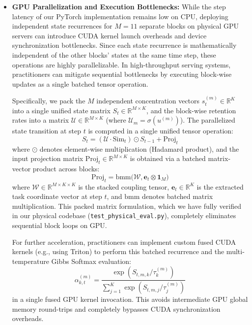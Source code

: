 \begin{itemize}
    \item \textbf{GPU Parallelization and Execution Bottlenecks:} While the step latency of our PyTorch implementation remains low on CPU, deploying independent state recurrences for $M=11$ separate blocks on physical GPU servers can introduce CUDA kernel launch overheads and device synchronization bottlenecks. Since each state recurrence is mathematically independent of the other blocks' states at the same time step, these operations are highly parallelizable. In high-throughput serving systems, practitioners can mitigate sequential bottlenecks by executing block-wise updates as a single batched tensor operation. 

    Specifically, we pack the $M$ independent concentration vectors $s^{(m)}_t \in \mathbb{R}^K$ into a single unified state matrix $S_t \in \mathbb{R}^{M \times K}$, and the block-wise retention rates into a matrix $\mathcal{U} \in \mathbb{R}^{M \times K}$ (where $\mathcal{U}_{m} = \sigma(u^{(m)})$). The parallelized state transition at step $t$ is computed in a single unified tensor operation:
    \begin{equation}
        S_t = (\mathcal{U} \cdot \text{Sim}_t) \odot S_{t-1} + \text{Proj}_t
    \end{equation}
    where $\odot$ denotes element-wise multiplication (Hadamard product), and the input projection matrix $\text{Proj}_t \in \mathbb{R}^{M \times K}$ is obtained via a batched matrix-vector product across blocks:
    \begin{equation}
        \text{Proj}_t = \text{bmm}\Big( \mathcal{W}, \mathbf{e}_t \otimes \mathbf{1}_M \Big)
    \end{equation}
    where $\mathcal{W} \in \mathbb{R}^{M \times K \times K}$ is the stacked coupling tensor, $\mathbf{e}_t \in \mathbb{R}^{K}$ is the extracted task coordinate vector at step $t$, and $\text{bmm}$ denotes batched matrix multiplication. This packed matrix formulation, which we have fully verified in our physical codebase (\texttt{test\_physical\_eval.py}), completely eliminates sequential block loops on GPU. 

    For further acceleration, practitioners can implement custom fused CUDA kernels (e.g., using Triton) to perform this batched recurrence and the multi-temperature Gibbs Softmax evaluation:
    \begin{equation}
        \alpha^{(m)}_{k, t} = \frac{\exp\left( S_{t, m, k} / \tau^{(m)}_k \right)}{\sum_{j=1}^K \exp\left( S_{t, m, j} / \tau^{(m)}_j \right)}
    \end{equation}
    in a single fused GPU kernel invocation. This avoids intermediate GPU global memory round-trips and completely bypasses CUDA synchronization overheads.


\end{itemize}
